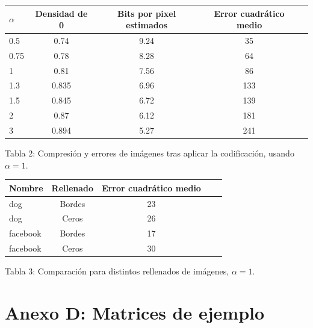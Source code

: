 \documentclass[%
final,
%
reprint,
%
notitlepage,
narroweqnarray,
inline,
twoside,
invited
]{ieee}
\begin{document}
\begin{center}
	\begin{tabular}{|l || c | c | c | c|}
		\hline
		\textbf{$\alpha$} & \textbf{Densidad de 0} & \textbf{Bits por pixel estimados} & \textbf{Error cuadrático medio}\\
		\hline
		\hline
		0.5 & 0.74 & 9.24 & 35\\
		0.75 & 0.78 & 8.28 & 64\\
		1 & 0.81 & 7.56 & 86\\
		1.3 & 0.835 & 6.96 & 133\\
		1.5 & 0.845 & 6.72 & 139\\
		2 & 0.87 & 6.12 & 181\\
		3 & 0.894 & 5.27 & 241\\
		\hline
	\end{tabular}
\end{center}
\begin{center}
Tabla 2: Compresión y errores de imágenes tras aplicar la codificación, usando $\alpha=1$.
\end{center}

\begin{center}
	\begin{tabular}{|l || c | c | c | c|}
		\hline
		\textbf{Nombre} & \textbf{Rellenado} & \textbf{Error cuadrático medio}\\
		\hline
		\hline
		dog & Bordes &  23\\
		dog & Ceros & 26\\
		facebook & Bordes & 17\\
		facebook & Ceros & 30\\
		\hline
	\end{tabular}
\end{center}
\begin{center}
Tabla 3: Comparación para distintos rellenados de imágenes, $\alpha=1$.
\end{center}

\section*{Anexo D: Matrices de ejemplo}
\end{document}
